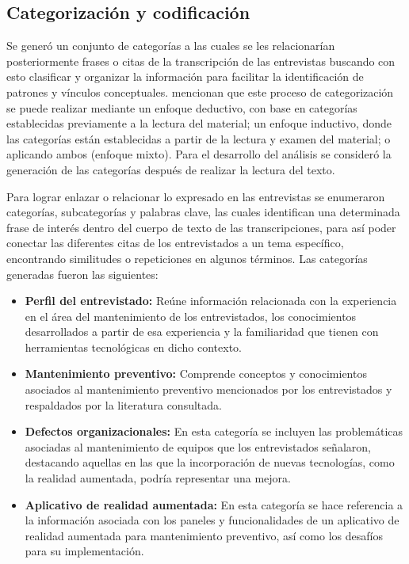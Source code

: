     \subsection{Categorización y codificación}

        Se generó un conjunto de categorías a las cuales se les relacionarían posteriormente frases o citas de la transcripción de las entrevistas buscando con esto clasificar y organizar la información para facilitar la identificación de patrones y vínculos conceptuales. \textcite{RODRIGUEZ:2005} mencionan que este proceso de categorización se puede realizar mediante un enfoque deductivo, con base en categorías establecidas previamente a la lectura del material; un enfoque inductivo, donde las categorías están establecidas a partir de la lectura y examen del material; o aplicando ambos (enfoque mixto). Para el desarrollo del análisis se consideró la generación de las categorías después de realizar la lectura del texto.

        Para lograr enlazar o relacionar lo expresado en las entrevistas se enumeraron categorías, subcategorías y palabras clave, las cuales identifican una determinada frase de interés dentro del cuerpo de texto de las transcripciones, para así poder conectar las diferentes citas de los entrevistados a un tema específico, encontrando similitudes o repeticiones en algunos términos. Las categorías generadas fueron las siguientes:

        \begin{itemize}

            \item \textbf{Perfil del entrevistado:} Reúne información relacionada con la experiencia en el área del mantenimiento de los entrevistados, los conocimientos desarrollados a partir de esa experiencia y la familiaridad que tienen con herramientas tecnológicas en dicho contexto.

            \item \textbf{Mantenimiento preventivo:} Comprende conceptos y conocimientos asociados al mantenimiento preventivo mencionados por los entrevistados y respaldados por la literatura consultada.

            \item \textbf{Defectos organizacionales:} En esta categoría se incluyen las problemáticas asociadas al mantenimiento de equipos que los entrevistados señalaron, destacando aquellas en las que la incorporación de nuevas tecnologías, como la realidad aumentada, podría representar una mejora.

            \item \textbf{Aplicativo de realidad aumentada:} En esta categoría se hace referencia a la información asociada con los paneles y funcionalidades de un aplicativo de realidad aumentada para mantenimiento preventivo, así como los desafíos para su implementación.

        \end{itemize}

